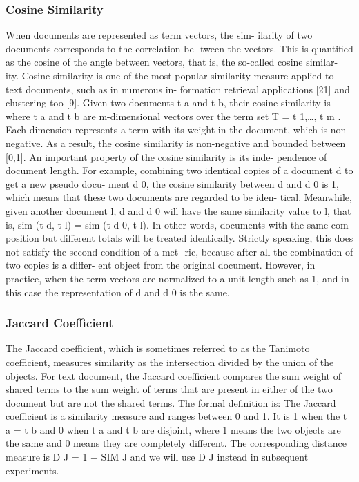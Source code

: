 \documentclass{VUMIFInfKursinis}
\begin{document}
		\subsubsection{Cosine Similarity}
			When documents are represented as term vectors, the sim- ilarity of two documents corresponds to the correlation be- tween the vectors. This is quantified as the cosine of the angle between vectors, that is, the so-called cosine similar- ity. Cosine similarity is one of the most popular similarity measure applied to text documents, such as in numerous in- formation retrieval applications [21] and clustering too [9].
			Given two documents t a and t b, their cosine similarity is
			where t a and t b are m-dimensional vectors over the term set T = {t 1,\ldots, t m }. Each dimension represents a term with its weight in the document, which is non-negative. As a result, the cosine similarity is non-negative and bounded between [0,1].
			An important property of the cosine similarity is its inde- pendence of document length. For example, combining two identical copies of a document d to get a new pseudo docu- ment d 0, the cosine similarity between d and d 0 is 1, which means that these two documents are regarded to be iden- tical. Meanwhile, given another document l, d and d 0 will have the same similarity value to l, that is, sim (t d, t l) = sim (t d 0, t l). In other words, documents with the same com- position but different totals will be treated identically. Strictly speaking, this does not satisfy the second condition of a met- ric, because after all the combination of two copies is a differ- ent object from the original document. However, in practice, when the term vectors are normalized to a unit length such as 1, and in this case the representation of d and d 0 is the same.

		\subsubsection{Jaccard Coefficient}
			The Jaccard coefficient, which is sometimes referred to as the Tanimoto coefficient, measures similarity as the intersection
			divided by the union of the objects. For text document, the Jaccard coefficient compares the sum weight of shared terms to the sum weight of terms that are present in either of the two document but are not the shared terms. The formal definition is:
			The Jaccard coefficient is a similarity measure and ranges between 0 and 1. It is 1 when the t a = t b and 0 when t a and t b are disjoint, where 1 means the two objects are the same and 0 means they are completely different. The corresponding distance measure is D J = 1 − SIM J and we will use D J instead in subsequent experiments.
\end{document}
